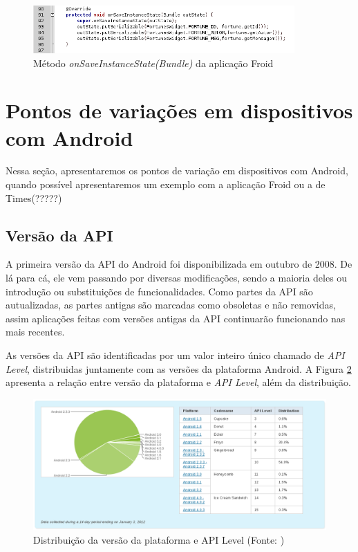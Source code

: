 \begin{figure}[h]
    \centering
    \includegraphics[width=10cm]{img/onSaveInstanceState}
    \caption{Método {\it onSaveInstanceState(Bundle)} da aplicação Froid}
    \label{onSaveInstanceState}
\end{figure}


\section{Pontos de variações em dispositivos com Android}

Nessa seção, apresentaremos os pontos de variação em dispositivos com Android,
quando possível apresentaremos um exemplo com a aplicação Froid ou a de Times(?????)

\subsection{Versão da API}

A primeira versão da API do Android foi disponibilizada em outubro de 2008. De lá 
para cá, ele vem passando por diversas modificações, sendo a maioria deles ou 
introdução ou substituições de funcionalidades. Como partes da API são autualizadas, 
as partes antigas são marcadas como obsoletas e não removidas, assim aplicações feitas
com versões antigas da API continuarão funcionando nas mais recentes.

As versões da API são identificadas por um valor inteiro único chamado de {\it API Level},
distribuidas juntamente com as versões da plataforma Android. A Figura \ref{api_level} 
apresenta a relação entre versão da plataforma e {\it API Level}, além da distribuição.

\begin{figure}[h]
    \centering
    \includegraphics[width=15cm]{img/api_level}
    \caption{Distribuição da versão da plataforma e API Level (Fonte: \cite{platform_versions}) }
    \label{api_level}
\end{figure}


